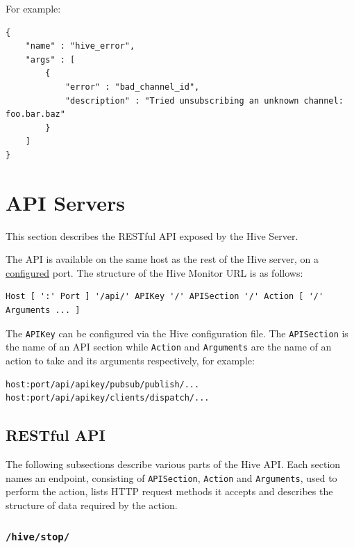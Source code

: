\documentclass[a4paper]{article}
\begin{document}
\noindent
For example:


\begin{verbatim}
{
    "name" : "hive_error",
    "args" : [
        {
            "error" : "bad_channel_id",
            "description" : "Tried unsubscribing an unknown channel: foo.bar.baz"
        }
    ]
}
\end{verbatim}




\pagebreak
\section{API Servers}
\label{sec-6}
\label{ref-hive_api}

This section describes the RESTful API exposed by the Hive Server.

\noindent
The API is available on the same host as the rest of the Hive server, on a \hyperref[ref-api-config]{configured} port. The structure of the Hive Monitor URL is as follows:


\begin{verbatim}
Host [ ':' Port ] '/api/' APIKey '/' APISection '/' Action [ '/' Arguments ... ]
\end{verbatim}




\noindent
The \texttt{APIKey} can be configured via the Hive configuration file. The \texttt{APISection} is the name of an API section while \texttt{Action} and \texttt{Arguments} are the name of an action to take and its arguments respectively, for example:


\begin{verbatim}
host:port/api/apikey/pubsub/publish/...
host:port/api/apikey/clients/dispatch/...
\end{verbatim}
\subsection{RESTful API}
\label{sec-6-1}

The following subsections describe various parts of the Hive API. Each section names an endpoint, consisting of \texttt{APISection}, \texttt{Action} and \texttt{Arguments}, used to perform the action, lists HTTP request methods it accepts and describes the structure of data required by the action.
\subsubsection{\texttt{/hive/stop/}}
\label{sec-6-1-1}
\label{ref-api_stop}
\end{document}
